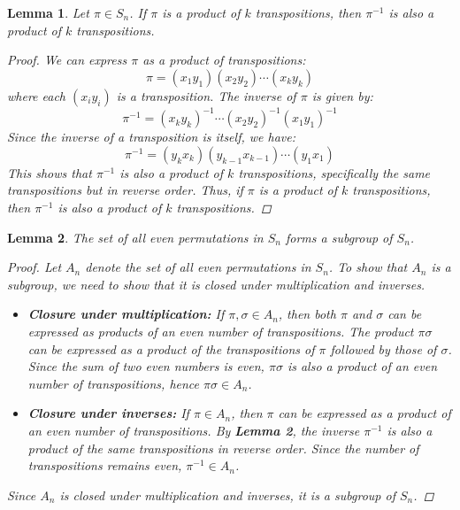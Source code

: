 \documentclass[12pt]{article}
\newtheorem{lemma}{Lemma}
\begin{document}
\begin{lemma}
  Let $\pi \in S_n$. If $\pi$ is a product of $k$ transpositions, then
  $\pi^{-1}$ is also a product of $k$ transpositions.
  \begin{proof}
    We can express $\pi$ as a product of transpositions:
    \[
      \pi = (x_1 y_1)(x_2 y_2) \cdots (x_k y_k)
    \]
    where each $(x_i y_i)$ is a transposition. The inverse of $\pi$ is given by:
    \[
      \pi^{-1} = (x_k y_k)^{-1} \cdots (x_2 y_2)^{-1} (x_1 y_1)^{-1}
    \]
    Since the inverse of a transposition is itself, we have:
    \[
      \pi^{-1} = (y_k x_k)(y_{k-1} x_{k-1}) \cdots (y_1 x_1)
    \]
    This shows that $\pi^{-1}$ is also a product of $k$ transpositions,
    specifically the same transpositions but in reverse order. Thus, if $\pi$ is a
    product of $k$ transpositions, then $\pi^{-1}$ is also a product of $k$ transpositions.
  \end{proof}
\end{lemma}


\begin{lemma}
  The set of all even permutations in $S_n$ forms a subgroup of $S_n$.
  \begin{proof}
    Let $A_n$ denote the set of all even permutations in $S_n$.
    To show that $A_n$ is a subgroup, we need to show that it is closed under multiplication and inverses.
    \begin{itemize}
      \item \textbf{Closure under multiplication:} If $\pi, \sigma \in A_n$,
            then both $\pi$ and $\sigma$ can be expressed as products of an even number of transpositions.
            The product $\pi \sigma$ can be expressed as a product of the transpositions of $\pi$ followed by those of $\sigma$.
            Since the sum of two even numbers is even, $\pi \sigma$ is also a product of an even number of transpositions, hence $\pi \sigma \in A_n$.
      \item \textbf{Closure under inverses:} If $\pi \in A_n$, then $\pi$ can be expressed as a product of an even number of transpositions.
            By \textbf{Lemma 2}, the inverse $\pi^{-1}$ is also a product of the same transpositions in reverse order.
            Since the number of transpositions remains even, $\pi^{-1} \in A_n$.
    \end{itemize}
    Since $A_n$ is closed under multiplication and inverses, it is a subgroup of $S_n$.
  \end{proof}
\end{lemma}
\end{document}
